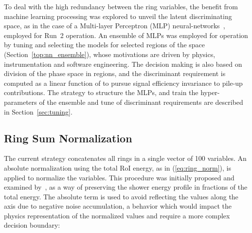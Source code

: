 To deal with the high redundancy between the ring variables, the benefit from machine learning processing was explored to unveil the latent discriminating space, as in
the case of a Multi-layer Perceptron (MLP) neural-networks~\cite{haykin_2008},
employed for Run~2 operation. 
An ensemble of MLPs was employed for operation by tuning and selecting
the models for selected regions of the \eteta space (Section~\ref{top:nn_ensemble}), whose
motivations are driven by physics, instrumentation and software 
engineering. The \rnn
decision making is also based on division of the phase space in regions, and the discriminant requirement is
computed as a linear function of \avgmu to pursue signal efficiency invariance
to pile-up contributions. 
The strategy to structure the MLPs,  and train the hyper-parameters of the ensemble and tune of discriminant requirements 
are described in Section~\ref{sec:tuning}.


%

\subsection{Ring Sum Normalization}\label{top:pp}

The current strategy concatenates all rings in a single vector of 100
variables. An absolute normalization using the total RoI energy, as in
(\ref{eq:ring_norm}), is applied to normalize the variables. This procedure was
initially proposed and examined by~\cite{1995_seixas_ringer}, as a way of
preserving the shower energy profile in fractions of the total energy. The
absolute term is used to avoid reflecting the values along the axis due to
negative noise accumulation, a behavior which would impact the physics
representation of the normalized values and require a more complex decision
boundary:

